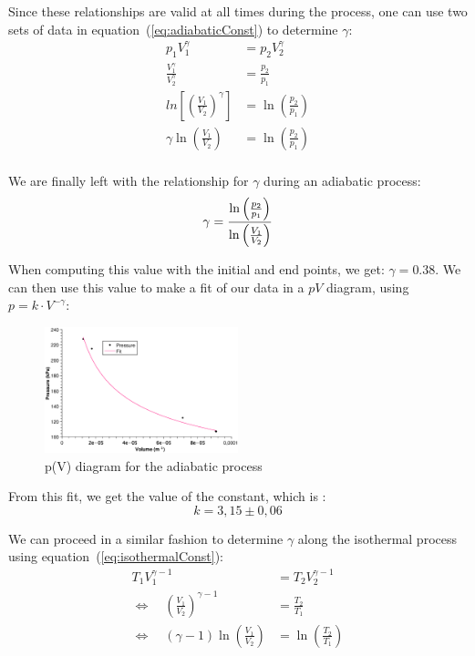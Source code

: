 \documentclass{scrartcl}
\begin{document}
Since these relationships are valid at all times during the process, one can use two sets of data in equation~(\ref{eq:adiabaticConst}) to determine $\gamma$:
\begin{align*}
    p_1V_1^{\gamma} &= p_2V_2^{\gamma} \\
    \frac{V_1^{\gamma}}{V_2^{\gamma}} &= \frac{p_2}{p_1} \\
    ln \left[ \left( \frac{V_1}{V_2} \right)^{\gamma} \right] &= \ln\left(\frac{p_2}{p_1}\right)\\
    \gamma \ln\left(\frac{V_1}{V_2}\right) &= \ln\left(\frac{p_2}{p_1}\right)\\
\end{align*}

We are finally left with the relationship for $\gamma$ during an adiabatic process: \begin{equation}
    \gamma = \frac{\ln\left(\frac{p_2}{p_1}\right)}{\ln\left(\frac{V_1}{V_2}\right)}\\
\end{equation}   
    
When computing this value with the initial and end points, we get: $\gamma = 0.38$. We can then use this value to make a fit of our data in a $pV$ diagram, using $p = k \cdot V^{-\gamma}$: 

\begin{figure}[!ht]
    \centering
    \includegraphics[width=0.5\textwidth]{3seg/adiabatic_3seg_gamma.eps}
    \caption{p(V) diagram for the adiabatic process}
    \label{fig:PV_adiabatic3}
\end{figure}
From this fit, we get the value of the constant, which is :
\[ \boxed{k = 3,15 \pm 0,06} \]

We can proceed in a similar fashion to determine $\gamma$ along the isothermal process using equation~(\ref{eq:isothermalConst}):
\begin{align*}
    T_1 V_1^{\gamma - 1} &= T_2 V_2^{\gamma - 1} \\
    \Leftrightarrow \quad \left( \frac{V_1}{V_2} \right)^{\gamma - 1} &= \frac{T_2}{T_1} \\
    \Leftrightarrow \quad (\gamma - 1 ) \ln{\left( \frac{V_1}{V_2} \right)} &= \ln \left( \frac{T_2}{T_1} \right) 
\end{align*}
\end{document}
